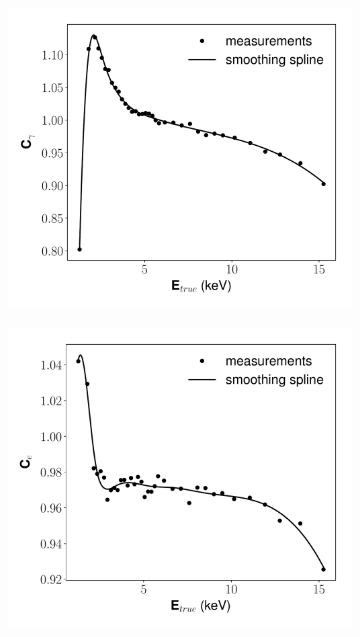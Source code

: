 \begin{figure}[h!]
\begin{subfigure}{0.45\textwidth}
  \caption{}
\end{subfigure}
\begin{subfigure}{0.45\textwidth}
  \centering
  \includegraphics[width=\textwidth]{Figures/yields_corrections/H3_LN_correction_gfdcm_180Vcm_prelim.pdf}
  \caption{}
\end{subfigure}%
\begin{subfigure}{0.45\textwidth}
  \centering
  \includegraphics[width=\textwidth]{Figures/yields_corrections/H3_QN_correction_gfdcm_180Vcm_prelim.pdf}

\end{subfigure}
\end{figure}
